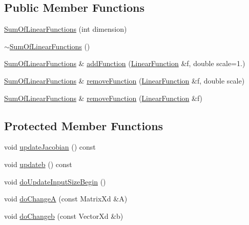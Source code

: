 \subsection*{Public Member Functions}
\begin{DoxyCompactItemize}
\item 
\hyperlink{classocra_1_1SumOfLinearFunctions_a70b277cb77618691688b7b6151ec126d}{Sum\+Of\+Linear\+Functions} (int dimension)
\item 
\hyperlink{classocra_1_1SumOfLinearFunctions_a0ca0f87d5eee6117cd521130a831d90e}{$\sim$\+Sum\+Of\+Linear\+Functions} ()
\item 
\hyperlink{classocra_1_1SumOfLinearFunctions}{Sum\+Of\+Linear\+Functions} \& \hyperlink{classocra_1_1SumOfLinearFunctions_a9ab412e1232557d36a84145360d57da7}{add\+Function} (\hyperlink{classocra_1_1LinearFunction}{Linear\+Function} \&f, double scale=1.)
\item 
\hyperlink{classocra_1_1SumOfLinearFunctions}{Sum\+Of\+Linear\+Functions} \& \hyperlink{classocra_1_1SumOfLinearFunctions_a2d3525455d1f4d2c19c7a72a33d1d600}{remove\+Function} (\hyperlink{classocra_1_1LinearFunction}{Linear\+Function} \&f, double scale)
\item 
\hyperlink{classocra_1_1SumOfLinearFunctions}{Sum\+Of\+Linear\+Functions} \& \hyperlink{classocra_1_1SumOfLinearFunctions_af22a2dd5debe1c87a4e3e664727e8754}{remove\+Function} (\hyperlink{classocra_1_1LinearFunction}{Linear\+Function} \&f)
\end{DoxyCompactItemize}
\subsection*{Protected Member Functions}
\begin{DoxyCompactItemize}
\item 
void \hyperlink{classocra_1_1SumOfLinearFunctions_a4597593267a02c2087ea84a327eae5dc}{update\+Jacobian} () const
\item 
void \hyperlink{classocra_1_1SumOfLinearFunctions_ad28c3b6f03dbe68080c06c0d9e4abffa}{updateb} () const
\item 
void \hyperlink{classocra_1_1SumOfLinearFunctions_a7cfc7b9339509922c2ea6173d4d4d141}{do\+Update\+Input\+Size\+Begin} ()
\item 
void \hyperlink{classocra_1_1SumOfLinearFunctions_a49346ac5b041b40540ce0c1ae5a6b0d2}{do\+ChangeA} (const Matrix\+Xd \&A)
\item 
void \hyperlink{classocra_1_1SumOfLinearFunctions_ab66be55a88e1c4e7d4e6f663f0a36683}{do\+Changeb} (const Vector\+Xd \&b)
\end{DoxyCompactItemize}
